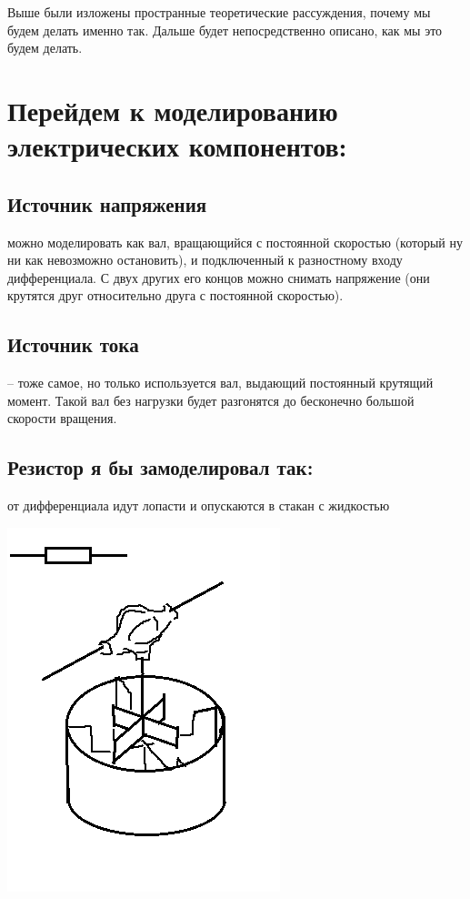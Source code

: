 \documentclass[11pt]{article} %
\begin{document}
Выше были изложены пространные теоретические рассуждения, почему мы будем делать именно так. Дальше будет непосредственно описано, как мы это будем делать.

\section{Перейдем к моделированию электрических компонентов:}

\subsection{Источник напряжения}
можно моделировать как вал, вращающийся с постоянной скоростью (который ну ни как невозможно остановить), и подключенный к разностному входу дифференциала. С двух других его концов можно снимать напряжение (они крутятся друг относительно друга с постоянной скоростью).

\subsection{Источник тока}
-- тоже самое, но только используется вал, выдающий постоянный крутящий момент.
Такой вал без нагрузки будет разгонятся до бесконечно большой скорости вращения.

\subsection{Резистор я бы замоделировал так:}
от дифференциала идут лопасти и опускаются в стакан с жидкостью

\includegraphics{../R.png}
\end{document}
